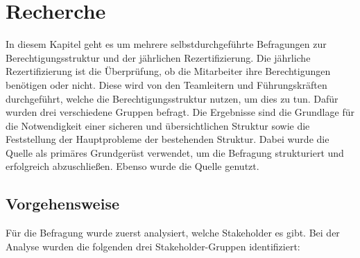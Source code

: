 \chapter{Recherche}
\label{ch:Recherche}
In diesem Kapitel geht es um mehrere selbstdurchgeführte Befragungen zur Berechtigungsstruktur und der jährlichen Rezertifizierung.
Die jährliche Rezertifizierung ist die Überprüfung, ob die Mitarbeiter ihre Berechtigungen benötigen oder nicht.
Diese wird von den Teamleitern und Führungskräften durchgeführt, welche die Berechtigungsstruktur nutzen, um dies zu tun.
Dafür wurden drei verschiedene Gruppen befragt.
Die Ergebnisse sind die Grundlage für die Notwendigkeit einer sicheren und übersichtlichen Struktur sowie die Feststellung der Hauptprobleme der bestehenden Struktur.
Dabei wurde die Quelle \cite{HowSurvey} als primäres Grundgerüst verwendet, um die Befragung strukturiert und erfolgreich abzuschließen. Ebenso wurde die Quelle \cite{Survey} genutzt.

\section{Vorgehensweise}
\label{sec:Vorgehensweise}
Für die Befragung wurde zuerst analysiert, welche Stakeholder es gibt.
Bei der Analyse wurden die folgenden drei Stakeholder-Gruppen identifiziert:

